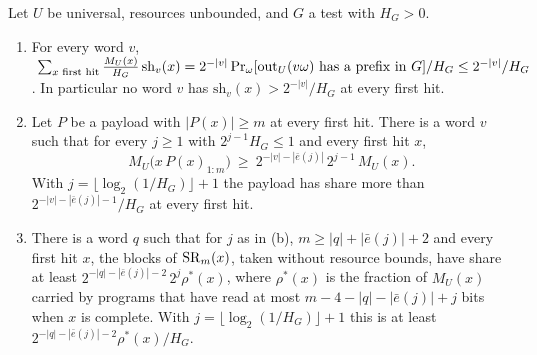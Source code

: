 \begin{theorem}\label{thm:search}
Let $U$ be universal, resources unbounded, and $G$ a test with $H_G>0$.
\begin{enumerate}[label=(\alph*),leftmargin=2em,itemsep=2pt,topsep=2pt]
\item For every word $v$,
$\ \sum_{x\text{ first hit}}\frac{M_U(x)}{H_G}\,\mathrm{sh}_v(x)=2^{-|v|}\Pr_\omega[\mathrm{out}_U(v\omega)\text{ has a prefix in }G]/H_G\le2^{-|v|}/H_G$.
In particular no word $v$ has $\mathrm{sh}_v(x)>2^{-|v|}/H_G$ at every first hit.
\item Let $P$ be a payload with $|P(x)|\ge m$ at every first hit. There is a word $v$ such that for every
$j\ge1$ with $2^{j-1}H_G\le1$ and every first hit $x$,
\[
M_U\bigl(x\,P(x)_{1:m}\bigr)\ \ge\ 2^{-|v|-|\bar e(j)|}\,2^{j-1}\,M_U(x) .
\]
With $j=\lfloor\log_2(1/H_G)\rfloor+1$ the payload has share more than $2^{-|v|-|\bar e(j)|-1}/H_G$ at every
first hit.
\item There is a word $q$ such that for $j$ as in (b), $m\ge|q|+|\bar e(j)|+2$ and every first hit $x$, the
blocks of $\mathrm{SR}_m(x)$, taken without resource bounds, have share at least
$2^{-|q|-|\bar e(j)|-2}\,2^{j}\rho^*(x)$, where $\rho^*(x)$ is the
fraction of $M_U(x)$ carried by programs that have read at most $m-4-|q|-|\bar e(j)|+j$ bits when $x$ is
complete. With $j=\lfloor\log_2(1/H_G)\rfloor+1$ this is at least $2^{-|q|-|\bar e(j)|-2}\rho^*(x)/H_G$.
\end{enumerate}
\end{theorem}
